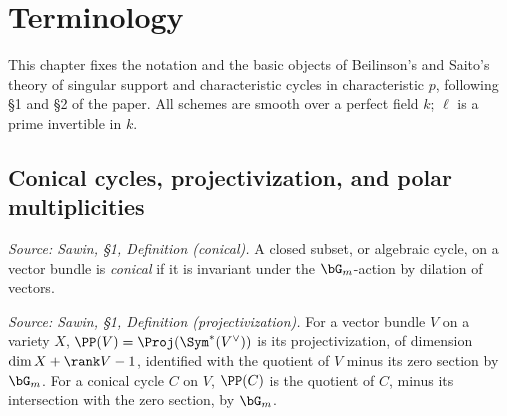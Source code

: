 \section{Terminology}


This chapter fixes the notation and the basic objects of Beilinson's and Saito's
theory of singular support and characteristic cycles in characteristic $p$,
following §1 and §2 of the paper.  All schemes are smooth over a perfect field
$k$; $\ell$ is a prime invertible in $k$.

\subsection{Conical cycles, projectivization, and polar multiplicities}

\begin{definition}
  \label{def:sawin_conical}
  \textit{Source: Sawin, §1, Definition (conical).}
  A closed subset, or algebraic cycle, on a vector bundle is \emph{conical} if it
  is invariant under the $\bG_m$-action by dilation of vectors.
\end{definition}

\begin{definition}
  \label{def:sawin_projectivization}
  \textit{Source: Sawin, §1, Definition (projectivization).}
  For a vector bundle $V$ on a variety $X$, $\PP(V) = \Proj(\Sym^*(V^\vee))$ is
  its projectivization, of dimension $\dim X + \rank V - 1$, identified with the
  quotient of $V$ minus its zero section by $\bG_m$.  For a conical cycle $C$ on
  $V$, $\PP(C)$ is the quotient of $C$, minus its intersection with the zero
  section, by $\bG_m$.
\end{definition}

